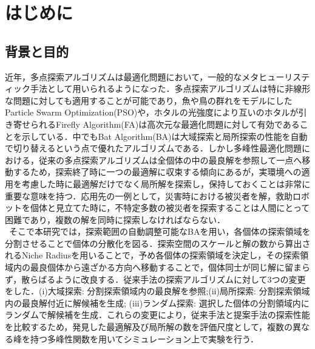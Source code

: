 \documentclass[a4j,11pt]{jarticle}
\begin{document}
\newpage
\setcounter{page}{1}
\pagestyle{fancy}
\cfoot{\thepage}
\chead{}
\lhead{}
\rhead{{\small \leftmark\ \ \ \ $-$\ \ \ \ \rightmark}}

\section{はじめに}
\subsection{背景と目的}
近年，多点探索アルゴリズムは最適化問題において，一般的なメタヒューリスティック手法として用いられるようになった．多点探索アルゴリズムは特に非線形な問題に対しても適用することが可能であり，魚や鳥の群れをモデルにしたParticle Swarm Optimization(PSO)\cite{PSO}や，ホタルの光強度により互いのホタルが引き寄せられるFirefly Algorithm(FA)\cite{FA}は高次元な最適化問題に対して有効であることを示している．中でもBat Algorithm(BA)は大域探索と局所探索の性能を自動で切り替えるという点で優れたアルゴリズムである\cite{BA}．しかし多峰性最適化問題における，従来の多点探索アルゴリズムは全個体の中の最良解を参照して一点へ移動するため，探索終了時に一つの最適解に収束する傾向にあるが，実環境への適用を考慮した時に最適解だけでなく局所解を探索し，保持しておくことは非常に重要な意味を持つ．応用先の一例として，災害時における被災者を解，救助ロボットを個体と見立てた時に，不特定多数の被災者を探索することは人間にとって困難であり，複数の解を同時に探索しなければならない．\\ \
そこで本研究では，探索範囲の自動調整可能なBAを用い，各個体の探索領域を分割させることで個体の分散化を図る．探索空間のスケールと解の数から算出されるNiche Radius\cite{niche}を用いることで，予め各個体の探索領域を決定し，その探索領域内の最良個体から遠ざかる方向へ移動することで，個体同士が同じ解に留まらず，散らばるように改良する．従来手法の探索アルゴリズムに対して3つの変更をした．(i)大域探索: 分割探索領域内の最良解を参照;(ii)局所探索: 分割探索領域内の最良解付近に解候補を生成; (iii)ランダム探索: 選択した個体の分割領域内にランダムで解候補を生成．これらの変更により，従来手法と提案手法の探索性能を比較するため，発見した最適解及び局所解の数を評価尺度として，複数の異なる峰を持つ多峰性関数を用いてシミュレーション上で実験を行う．\\ \
\end{document}

